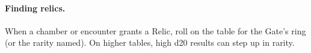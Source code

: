 \paragraph{Finding relics.}
When a chamber or encounter grants a Relic, roll on the table for the Gate's ring (or the rarity named). On higher tables, high d20 results can step up in rarity.


